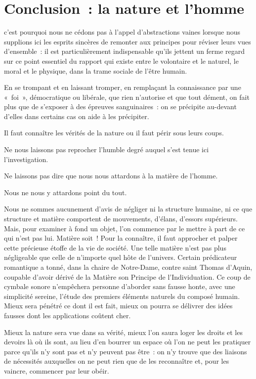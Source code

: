\documentclass[french,twoside]{book} %
\begin{document}
\section[{Conclusion : la nature et l’homme}]{Conclusion : la nature et l’homme}
\noindent c’est pourquoi nous ne cédons pas à l’appel d’abstractions vaines lorsque nous supplions ici les esprits sincères de remonter aux principes pour réviser leurs vues d’ensemble : il est particulièrement indispensable qu’ils jettent un ferme regard sur ce point essentiel du rapport qui existe entre le volontaire et le naturel, le moral et le physique, dans la trame sociale de l’être humain.\par
En se trompant et en laissant tromper, en remplaçant la connaissance par une « foi », démocratique ou libérale, que rien n’autorise et que tout dément, on fait plus que de s’exposer à des épreuves sanguinaires : on se précipite au-devant d’elles dans certains cas on aide à les précipiter.\par
Il faut connaître les vérités de la nature ou il faut périr sous leurs coups.\par
Ne nous laissons pas reprocher l’humble degré auquel s’est tenue ici l’investigation.\par
Ne laissons pas dire que nous nous attardons à la matière de l’homme.\par
Nous ne nous y attardons point du tout.\par
Nous ne sommes aucunement d’avis de négliger ni la structure humaine, ni ce que structure et matière comportent de mouvements, d’élans, d’essors supérieurs. Mais, pour examiner à fond un objet, l’on commence par le mettre à part de ce qui n’est pas lui. Matière soit ! Pour la connaître, il faut approcher et palper cette précieuse étoffe de la vie de société. Une telle matière n’est pas plus négligeable que celle de n’importe quel hôte de l’univers. Certain prédicateur romantique a tonné, dans la chaire de Notre-Dame, contre saint Thomas d’Aquin, coupable d’avoir dérivé de la Matière son Principe de l’Individuation. Ce coup de cymbale sonore n’empêchera personne d’aborder sans fausse honte, avec une simplicité sereine, l’étude des premiers éléments naturels du composé humain. Mieux sera pénétré ce dont il est fait, mieux on pourra se délivrer des idées fausses dont les applications coûtent cher.\par
Mieux la nature sera vue dans sa vérité, mieux l’on saura loger les droits et les devoirs là où ils sont, au lieu d’en bourrer un espace où l’on ne peut les pratiquer parce qu’ils n’y sont pas et n’y peuvent pas être : on n’y trouve que des liaisons de nécessités auxquelles on ne peut rien que de les reconnaître et, pour les vaincre, commencer par leur obéir.\par
\end{document}
